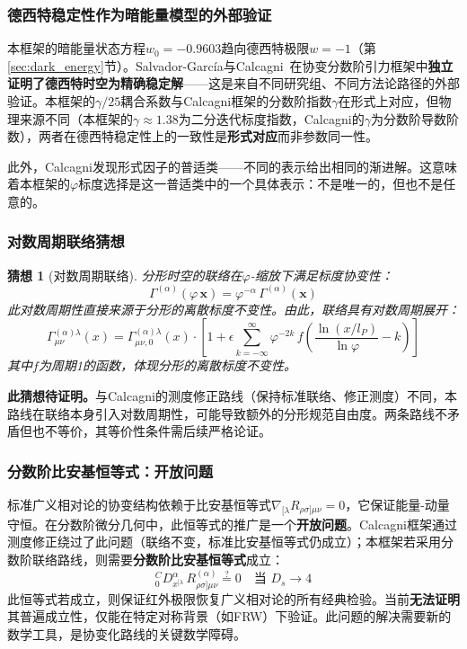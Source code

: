 \documentclass[12pt,a4paper,twocolumn]{article}
\renewcommand{\phi}{\varphi}
\newtheorem{conjecture}[theorem]{猜想}
\begin{document}
\subsubsection{德西特稳定性作为暗能量模型的外部验证}

本框架的暗能量状态方程$w_0 = -0.9603$趋向德西特极限$w = -1$（第\ref{sec:dark_energy}节）。Salvador-Garc\'ia与Calcagni~\cite{SalvadorGarcia2026}在协变分数阶引力框架中\textbf{独立证明了德西特时空为精确稳定解}——这是来自不同研究组、不同方法论路径的外部验证。本框架的$\gamma/25$耦合系数与Calcagni框架的分数阶指数$\gamma$在形式上对应，但物理来源不同（本框架的$\gamma\approx 1.38$为二分迭代标度指数，Calcagni的$\gamma$为分数阶导数阶数），两者在德西特稳定性上的一致性是\textbf{形式对应}而非参数同一性。

此外，Calcagni发现形式因子的普适类——不同的表示给出相同的渐进解。这意味着本框架的$\phi$标度选择是这一普适类中的一个具体表示：不是唯一的，但也不是任意的。

\subsubsection{对数周期联络猜想}

\begin{conjecture}[对数周期联络]
分形时空的联络在$\phi$-缩放下满足标度协变性：
\begin{equation}
\Gamma^{(\alpha)}(\phi\,\mathbf{x}) = \phi^{-\alpha}\,\Gamma^{(\alpha)}(\mathbf{x})
\label{eq:log_periodic_connection}
\end{equation}
此对数周期性直接来源于分形的离散标度不变性。由此，联络具有对数周期展开：
\[
\Gamma^{(\alpha)\lambda}_{\mu\nu}(x) = \Gamma^{(\alpha)\lambda}_{\mu\nu,0}(x)\cdot\left[1 + \epsilon\sum_{k=-\infty}^{\infty}\phi^{-2k}\,f\!\left(\frac{\ln(x/l_P)}{\ln\phi} - k\right)\right]
\]
其中$f$为周期1的函数，体现分形的离散标度不变性。
\end{conjecture}

\textbf{此猜想待证明。}与Calcagni的测度修正路线（保持标准联络、修正测度）不同，本路线在联络本身引入对数周期性，可能导致额外的分形规范自由度。两条路线不矛盾但也不等价，其等价性条件需后续严格论证。

\subsubsection{分数阶比安基恒等式：开放问题}

标准广义相对论的协变结构依赖于比安基恒等式$\nabla_{[\lambda}R_{\rho\sigma]\mu\nu} = 0$，它保证能量-动量守恒。在分数阶微分几何中，此恒等式的推广是一个\textbf{开放问题}。Calcagni框架通过测度修正绕过了此问题（联络不变，标准比安基恒等式仍成立）；本框架若采用分数阶联络路线，则需要\textbf{分数阶比安基恒等式}成立：
\[
{}^C_0D_{x^{[\lambda}}^\alpha\,R^{(\alpha)}_{\rho\sigma]\mu\nu} \stackrel{?}{=} 0 \quad \text{当 } D_s \to 4
\]
此恒等式若成立，则保证红外极限恢复广义相对论的所有经典检验。当前\textbf{无法证明}其普遍成立性，仅能在特定对称背景（如FRW）下验证。此问题的解决需要新的数学工具，是协变化路线的关键数学障碍。
\end{document}
